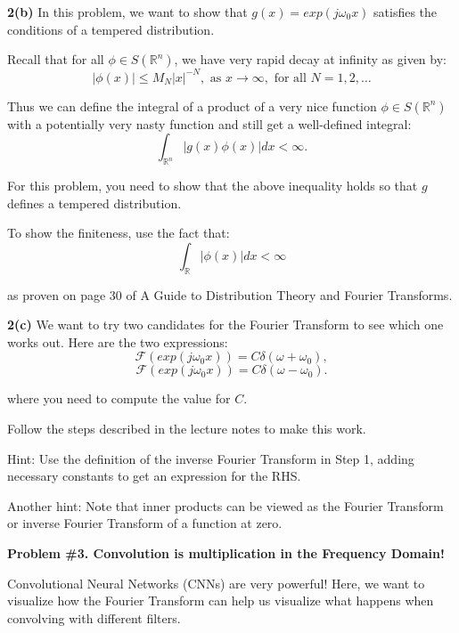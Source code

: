 \documentclass[11pt]{article}
\begin{document}
	\vspace{1em}
	
	\textbf{2(b)} In this problem, we want to show that $g(x) = exp(j\omega_0 x)$ satisfies the conditions of a tempered distribution.
	
	Recall that for all $\phi \in S(\mathbb{R}^n)$, we have very rapid decay at infinity as given by:
	\[
	|\phi(x)| \le M_N |x|^{-N}, \text{ as } x \to \infty, \text{ for all } N = 1, 2, \dots
	\]
	
	Thus we can define the integral of a product of a very nice function $\phi \in S(\mathbb{R}^n)$ with a potentially very nasty function and still get a well-defined integral:
	\[
	\int_{\mathbb{R}^n} |g(x)\phi(x)| dx < \infty.
	\]
	
	For this problem, you need to show that the above inequality holds so that $g$ defines a tempered distribution.
	
	To show the finiteness, use the fact that:
	\[
	\int_{\mathbb{R}} |\phi(x)| dx < \infty
	\]
	
	as proven on page 30 of A Guide to Distribution Theory and Fourier Transforms.
	
	\vspace{1em}
	
	\textbf{2(c)} We want to try two candidates for the Fourier Transform to see which one works out. Here are the two expressions:
	\[
	\mathcal{F}(exp(j\omega_0 x)) = C\delta(\omega + \omega_0),
	\]
	\[
	\mathcal{F}(exp(j\omega_0 x)) = C\delta(\omega - \omega_0).
	\]
	
	where you need to compute the value for $C$.
	
	Follow the steps described in the lecture notes to make this work.
	
	Hint: Use the definition of the inverse Fourier Transform in Step 1, adding necessary constants to get an expression for the RHS.
	
	Another hint: Note that inner products can be viewed as the Fourier Transform or inverse Fourier Transform of a function at zero.
	
	\vspace{1em}
	
	\textbf{Problem \#3. Convolution is multiplication in the Frequency Domain!}
	
	Convolutional Neural Networks (CNNs) are very powerful! Here, we want to visualize how the Fourier Transform can help us visualize what happens when convolving with different filters.
	
\end{document}
